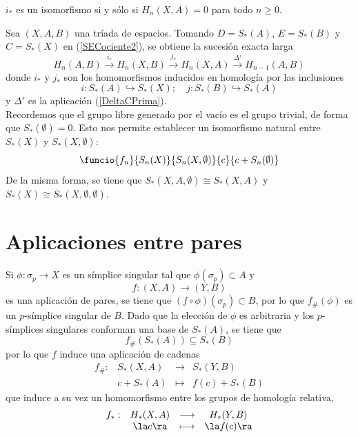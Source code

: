 
\begin{prop}
$i_*$ es un isomorfismo si y sólo si $H_n(X,A)=0$ para todo $n \geq 0$.
\end{prop}


Sea $(X,A,B)$ una tríada de espacios. Tomando $D=S_*(A)$, $E=S_*(B)$ y $C=S_*(X)$ en (\ref{SECociente2}), se obtiene la sucesión exacta larga $$H_n(A,B) \stackrel{i_*}{\longrightarrow} H_n(X,B) \stackrel{j_*}\longrightarrow H_n(X,A) \stackrel{\Delta'}{\longrightarrow} H_{n-1}(A,B)$$ donde $i_*$ y $j_*$ son los homomorfismos inducidos en homología por las inclusiones $$i: S_*(A) \hookrightarrow S_*(X); \quad j: S_*(B) \hookrightarrow S_*(A)$$ y $\Delta'$ es la aplicación (\ref{DeltaCPrima}).
\\

Recordemos que el grupo libre generado por el vacío es el grupo trivial, de forma que $S_*(\emptyset)=0$. Esto nos permite establecer un isomorfismo natural entre $S_*(X)$ y $S_*(X,\emptyset)$: $$\funcio{f_n}{S_n(X)}{S_n(X,\emptyset)}{c}{c+S_n(\emptyset)}$$ De la misma forma, se tiene que $S_*(X,A,\emptyset) \cong S_*(X,A)$ y $S_*(X)\cong S_*(X,\emptyset,\emptyset)$.

\section{Aplicaciones entre pares}

Si $\phi: \sigma_p \longrightarrow X$ es un símplice singular tal que $\phi(\sigma_p) \subset A$ y $$f: (X,A) \longrightarrow (Y,B)$$ es una aplicación de pares, se tiene que $(f\circ\phi)(\sigma_p) \subset B$, por lo que $f_\#(\phi)$ es un $p$-símplice singular de $B$. Dado que la elección de $\phi$ es arbitraria y los $p$-símplices singulares conforman una base de $S_*(A)$, se tiene que $$f_\#(S_*(A)) \subseteq S_*(B)$$ por lo que $f$ induce una aplicación de cadenas
\[\begin{array}{cccc}
f_\#:&S_*(X,A)&\longrightarrow&S_*(Y,B)\\
	 &c+S_*(A)&\longmapsto	 &f(c)+S_*(B)
\end{array}\]
que induce a su vez un homomorfismo entre los grupos de homología relativa,
\[\begin{array}{cccc}
f_*:&H_*(X,A)&\longrightarrow&H_*(Y,B)\\
	 &\la c\ra&\longmapsto	 &\la f(c)\ra
\end{array}\]

